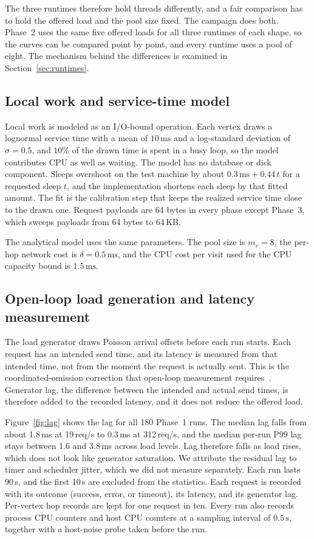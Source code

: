 The three runtimes therefore hold threads differently, and a fair comparison has to hold the offered load and the pool size fixed. The campaign does both. Phase~2 uses the same five offered loads for all three runtimes of each shape, so the curves can be compared point by point, and every runtime uses a pool of eight. The mechanism behind the differences is examined in Section~\ref{sec:runtimes}.

\subsection{Local work and service-time model}

Local work is modeled as an I/O-bound operation. Each vertex draws a lognormal service time with a mean of $10\,\mathrm{ms}$ and a log-standard deviation of $\sigma=0.5$, and $10\%$ of the drawn time is spent in a busy loop, so the model contributes CPU as well as waiting. The model has no database or disk component. Sleeps overshoot on the test machine by about $0.3\,\mathrm{ms}+0.44\,t$ for a requested sleep $t$, and the implementation shortens each sleep by that fitted amount. The fit is the calibration step that keeps the realized service time close to the drawn one. Request payloads are 64 bytes in every phase except Phase~3, which sweeps payloads from 64 bytes to 64\,KB.

The analytical model uses the same parameters. The pool size is $m_v=8$, the per-hop network cost is $\delta=0.5\,\mathrm{ms}$, and the CPU cost per visit used for the CPU capacity bound is $1.5\,\mathrm{ms}$.

\subsection{Open-loop load generation and latency measurement}

The load generator draws Poisson arrival offsets before each run starts. Each request has an intended send time, and its latency is measured from that intended time, not from the moment the request is actually sent. This is the coordinated-omission correction that open-loop measurement requires~\cite{schroeder2006open}. Generator lag, the difference between the intended and actual send times, is therefore added to the recorded latency, and it does not reduce the offered load.

Figure~\ref{fig:lag} shows the lag for all 180 Phase~1 runs. The median lag falls from about 1.8\,ms at 19\,req/s to 0.3\,ms at 312\,req/s, and the median per-run P99 lag stays between 1.6 and 3.8\,ms across load levels. Lag therefore falls as load rises, which does not look like generator saturation. We attribute the residual lag to timer and scheduler jitter, which we did not measure separately. Each run lasts 90\,s, and the first 10\,s are excluded from the statistics. Each request is recorded with its outcome (success, error, or timeout), its latency, and its generator lag. Per-vertex hop records are kept for one request in ten. Every run also records process CPU counters and host CPU counters at a sampling interval of $0.5\,\mathrm{s}$, together with a host-noise probe taken before the run.

